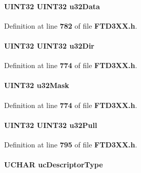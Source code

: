 \paragraph[{u32\+Data}]{\setlength{\rightskip}{0pt plus 5cm}U\+I\+N\+T32 U\+I\+N\+T32 u32\+Data}\label{FTD3XX_8h_a12546d6293e972735695c3ca9b43a6cd}


Definition at line {\bf 782} of file {\bf F\+T\+D3\+X\+X.\+h}.

\paragraph[{u32\+Dir}]{\setlength{\rightskip}{0pt plus 5cm}U\+I\+N\+T32 U\+I\+N\+T32 u32\+Dir}\label{FTD3XX_8h_ad77b1c681be5fe7684861dbb96b2c1f5}


Definition at line {\bf 774} of file {\bf F\+T\+D3\+X\+X.\+h}.

\paragraph[{u32\+Mask}]{\setlength{\rightskip}{0pt plus 5cm}U\+I\+N\+T32 u32\+Mask}\label{FTD3XX_8h_a9358feb252e340a8af49eda553afef17}


Definition at line {\bf 774} of file {\bf F\+T\+D3\+X\+X.\+h}.

\paragraph[{u32\+Pull}]{\setlength{\rightskip}{0pt plus 5cm}U\+I\+N\+T32 U\+I\+N\+T32 u32\+Pull}\label{FTD3XX_8h_a753345eed218455a0659d1a199f04143}


Definition at line {\bf 795} of file {\bf F\+T\+D3\+X\+X.\+h}.

\paragraph[{uc\+Descriptor\+Type}]{\setlength{\rightskip}{0pt plus 5cm}U\+C\+H\+AR uc\+Descriptor\+Type}\label{FTD3XX_8h_a46f6ca8e5e7d1b89097819913ee6047b}


